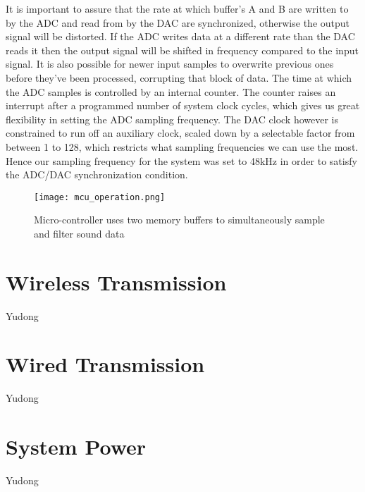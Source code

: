 It is important to assure that the rate at which buffer's A and B are written to by the ADC and read from by the DAC are synchronized, otherwise the output signal will be distorted. If the ADC writes data at a different rate than the DAC reads it then the output signal will be shifted in frequency compared to the input signal. It is also possible for newer input samples to overwrite previous ones before they've been processed, corrupting that block of data. The time at which the ADC samples is controlled by an internal counter. The counter raises an interrupt after a programmed number of system clock cycles, which gives us great flexibility in setting the ADC sampling frequency. The DAC clock however is constrained to run off an auxiliary clock, scaled down by a selectable factor from between 1 to 128, which restricts what sampling frequencies we can use the most. Hence our sampling frequency for the system was set to 48kHz in order to satisfy the ADC/DAC synchronization condition.

\begin{figure}[!htb]
	\centering
		\texttt{[image: mcu\_operation.png]}
	\caption{Micro-controller uses two memory buffers to simultaneously sample and filter sound data}
	\label{fig:mcu_operation}
\end{figure}



\section{Wireless Transmission}
Yudong

\section{Wired Transmission}
Yudong

\section{System Power}
Yudong